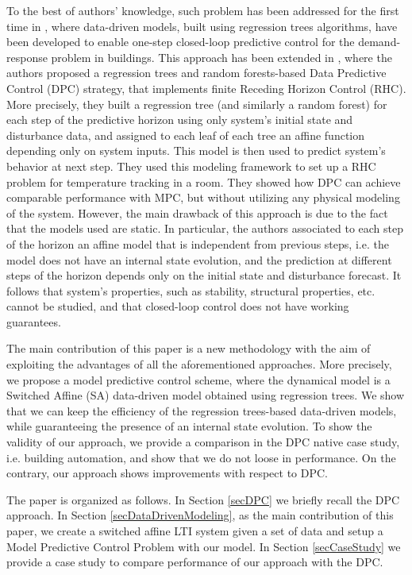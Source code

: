 \documentclass[letterpaper, 10 pt, conference]{ifacconf}  %
\begin{document}
To the best of authors' knowledge, such problem has been addressed for the first time in \cite{BehlAE2016}, where data-driven models, built using regression trees algorithms, have been developed to enable one-step closed-loop predictive control for the demand-response problem in buildings. This approach has been extended in \cite{JainACC2017,JainCDC2017}, where the authors proposed a regression trees and random forests-based Data Predictive Control (DPC) strategy, that implements finite Receding Horizon Control (RHC). More precisely, they built a regression tree (and similarly a random forest) for each step of the predictive horizon using only system's initial state and disturbance data, and assigned to each leaf of each tree an affine function depending only on system inputs. This model is then used to predict system's behavior at next step. They used this modeling framework to set up a RHC problem for temperature tracking in a room. They showed how DPC can achieve comparable performance with MPC, but without utilizing any physical modeling of the system. However, the main drawback of this approach is due to the fact that the models used are static. In particular, the authors associated to each step of the horizon an affine model that is independent from previous steps, i.e. the model does not have an internal state evolution, and the prediction at different steps of the horizon depends only on the initial state and disturbance forecast. It follows that system's properties, such as stability, structural properties, etc. cannot be studied, and that closed-loop control does not have working guarantees.

The main contribution of this paper is a new methodology with the aim of exploiting the advantages of all the aforementioned approaches. More precisely, we propose a model predictive control scheme, where the dynamical model is a Switched Affine (SA) data-driven model obtained using regression trees. We show that we can keep the efficiency of the regression trees-based data-driven models, while guaranteeing the presence of an internal state evolution. To show the validity of our approach, we provide a comparison in the DPC native case study, i.e. building automation, and show that we do not loose in performance. On the contrary, our approach shows improvements with respect to DPC.

The paper is organized as follows. In Section \ref{secDPC} we briefly recall the DPC approach. In Section \ref{secDataDrivenModeling}, as the main contribution of this paper, we create a switched affine LTI system given a set of data and setup a Model Predictive Control Problem with our model. In Section \ref{secCaseStudy} we provide a case study to compare performance of our approach with the DPC.
\end{document}
